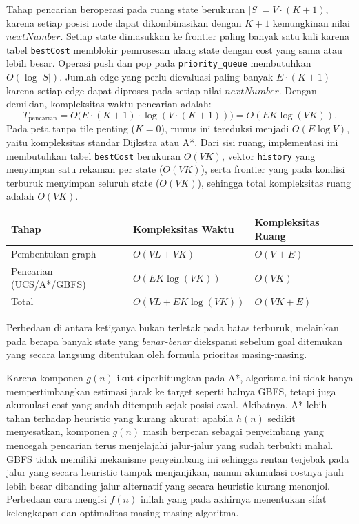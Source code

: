 \documentclass[a4paper,11pt]{article}
\begin{document}
Tahap pencarian beroperasi pada ruang state berukuran $|S| = V \cdot (K+1)$, karena setiap posisi node dapat dikombinasikan dengan $K+1$ kemungkinan nilai $nextNumber$. Setiap state dimasukkan ke frontier paling banyak satu kali karena tabel \texttt{bestCost} memblokir pemrosesan ulang state dengan cost yang sama atau lebih besar. Operasi push dan pop pada \texttt{priority\_queue} membutuhkan $O(\log |S|)$. Jumlah edge yang perlu dievaluasi paling banyak $E \cdot (K+1)$ karena setiap edge dapat diproses pada setiap nilai $nextNumber$. Dengan demikian, kompleksitas waktu pencarian adalah:
\[
T_{\text{pencarian}} = O\bigl(E \cdot (K+1) \cdot \log(V \cdot (K+1))\bigr) = O(EK \log(VK)).
\]
Pada peta tanpa tile penting ($K = 0$), rumus ini tereduksi menjadi $O(E \log V)$, yaitu kompleksitas standar Dijkstra atau A*. Dari sisi ruang, implementasi ini membutuhkan tabel \texttt{bestCost} berukuran $O(VK)$, vektor \texttt{history} yang menyimpan satu rekaman per state ($O(VK)$), serta frontier yang pada kondisi terburuk menyimpan seluruh state ($O(VK)$), sehingga total kompleksitas ruang adalah $O(VK)$.


\begin{longtable}{|p{3.5cm}|p{5cm}|p{5cm}|}
    \hline
    \textbf{Tahap} & \textbf{Kompleksitas Waktu} & \textbf{Kompleksitas Ruang} \\
    \hline
    \endhead
    Pembentukan graph & $O(VL + VK)$ & $O(V + E)$ \\
    \hline
    Pencarian (UCS/A*/GBFS) & $O(EK \log(VK))$ & $O(VK)$ \\
    \hline
    Total & $O(VL + EK \log(VK))$ & $O(VK + E)$ \\
    \hline
\end{longtable}

 Perbedaan di antara ketiganya bukan terletak pada batas terburuk, melainkan pada berapa banyak state yang \textit{benar-benar} diekspansi sebelum goal ditemukan yang secara langsung ditentukan oleh formula prioritas masing-masing.

Karena komponen $g(n)$ ikut diperhitungkan pada A*, algoritma ini tidak hanya mempertimbangkan estimasi jarak ke target seperti halnya GBFS, tetapi juga akumulasi cost yang sudah ditempuh sejak posisi awal. Akibatnya, A* lebih tahan terhadap heuristic yang kurang akurat: apabila $h(n)$ sedikit menyesatkan, komponen $g(n)$ masih berperan sebagai penyeimbang yang mencegah pencarian terus menjelajahi jalur-jalur yang sudah terbukti mahal. GBFS tidak memiliki mekanisme penyeimbang ini sehingga rentan terjebak pada jalur yang secara heuristic tampak menjanjikan, namun akumulasi costnya jauh lebih besar dibanding jalur alternatif yang secara heuristic kurang menonjol. Perbedaan cara mengisi $f(n)$ inilah yang pada akhirnya menentukan sifat kelengkapan dan optimalitas masing-masing algoritma.
\end{document}
